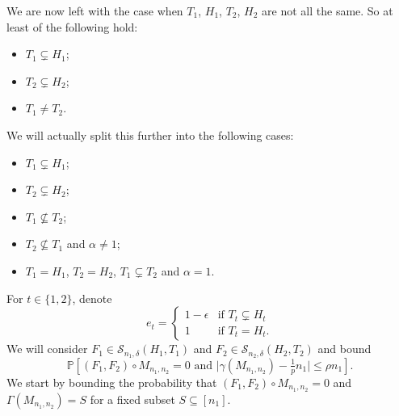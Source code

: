 \documentclass[12pt]{amsart}
\theoremstyle{definition}
\newcommand{\PPP}{\mathbb{P}}
\newcommand{\SSS}[3]{\mathcal{S}_{#1}(#2,#3)}
\newcommand{\Mnot}{M_{n_1,n_2}}
\newcommand{\abs}[1]{\vert#1\vert}
\begin{document}
We are now left with the case when $T_1$, $H_1$, $T_2$, $H_2$ are not all the same.
So at least of the following hold:
\begin{itemize}
    \item $T_1\subsetneq H_1$;
    \item $T_2\subsetneq H_2$;
    \item $T_1\neq T_2$.
\end{itemize}
We will actually split this further into the following cases:
\begin{itemize}
    \item $T_1\subsetneq H_1$;
    \item $T_2\subsetneq H_2$;
    \item $T_1\not\subseteq T_2$;
    \item $T_2\not\subseteq T_1$ and $\alpha\neq 1$;
    \item $T_1=H_1$, $T_2=H_2$, $T_1\subsetneq T_2$ and $\alpha=1$.
\end{itemize}

For $t\in\{1,2\}$, denote
\[
e_t
= \begin{cases}
    1-\epsilon &\text{if } T_t\subsetneq H_t\\
    1 &\text{if } T_t= H_t.
\end{cases}
\]
We will consider $F_1\in \SSS{n_1,\delta}{H_1}{T_1}$ and $F_2\in \SSS{n_2,\delta}{H_2}{T_2}$ and bound
\[
\PPP[(F_1,F_2)\circ \Mnot=0 
\text{ and } 
\abs{\gamma(\Mnot) -\tfrac{1}{p} n_1}\leq \rho n_1].
\]
We start by bounding the probability that $(F_1,F_2)\circ \Mnot=0$ and $\Gamma(\Mnot)=S$ for a fixed subset $S\subseteq [n_1]$.
 
\end{document}
